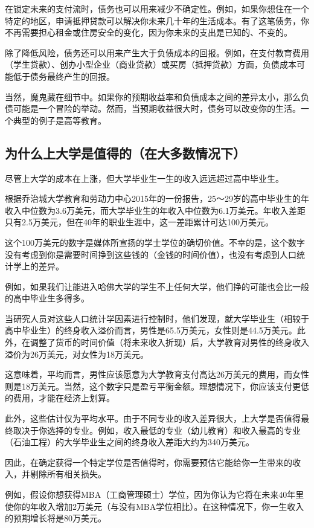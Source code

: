在锁定未来的支付流时，债务也可以用来减少不确定性。例如，如果你想住在一个特定的地区，申请抵押贷款可以解决你未来几十年的生活成本。有了这笔债务，你不再需要担心租金或住房安全的变化，因为你未来的支出是已知的、不变的。

除了降低风险，债务还可以用来产生大于负债成本的回报。例如，在支付教育费用（学生贷款）、创办小型企业（商业贷款）或买房（抵押贷款）方面，负债成本可能低于债务最终产生的回报。

当然，魔鬼藏在细节中。如果你的预期收益率和负债成本之间的差异太小，那么负债可能是一个冒险的举动。然而，当预期收益很大时，债务可以改变你的生活。一个典型的例子是高等教育。

\subsection{为什么上大学是值得的（在大多数情况下）}
尽管上大学的成本在上涨，但大学毕业生一生的收入远远超过高中毕业生。

根据乔治城大学教育和劳动力中心2015年的一份报告，25～29岁的高中毕业生的年收入中位数为3.6万美元，而大学毕业生的年收入中位数为6.1万美元。年收入差距只有2.5万美元，但在40年的职业生涯中，这一差距累计可达100万美元。

这个100万美元的数字是媒体所宣扬的学士学位的确切价值。不幸的是，这个数字没有考虑到你是需要时间挣到这些钱的（金钱的时间价值），也没有考虑到人口统计学上的差异。

例如，如果我们让能进入哈佛大学的学生不上任何大学，他们挣的可能也会比一般的高中毕业生多得多。

当研究人员对这些人口统计学因素进行控制时，他们发现，就大学毕业生（相较于高中毕业生）的终身收入溢价而言，男性是65.5万美元，女性则是44.5万美元。此外，在调整了货币的时间价值（将未来收入折现）后，大学教育对男性的终身收入溢价为26万美元，对女性为18万美元。

这意味着，平均而言，男性应该愿意为大学教育支付高达26万美元的费用，而女性则是18万美元。当然，这个数字只是盈亏平衡金额。理想情况下，你应该支付更低的费用，才能在经济上划算。

此外，这些估计仅为平均水平。由于不同专业的收入差异很大，上大学是否值得最终取决于你选择的专业。例如，收入最低的专业（幼儿教育）和收入最高的专业（石油工程）的大学毕业生之间的终身收入差距大约为340万美元。

因此，在确定获得一个特定学位是否值得时，你需要预估它能给你一生带来的收入，并剔除所有相关损失。

例如，假设你想获得MBA（工商管理硕士）学位，因为你认为它将在未来40年里使你的年收入增加2万美元（与没有MBA学位相比）。在这种情况下，你一生收入的预期增长将是80万美元。

